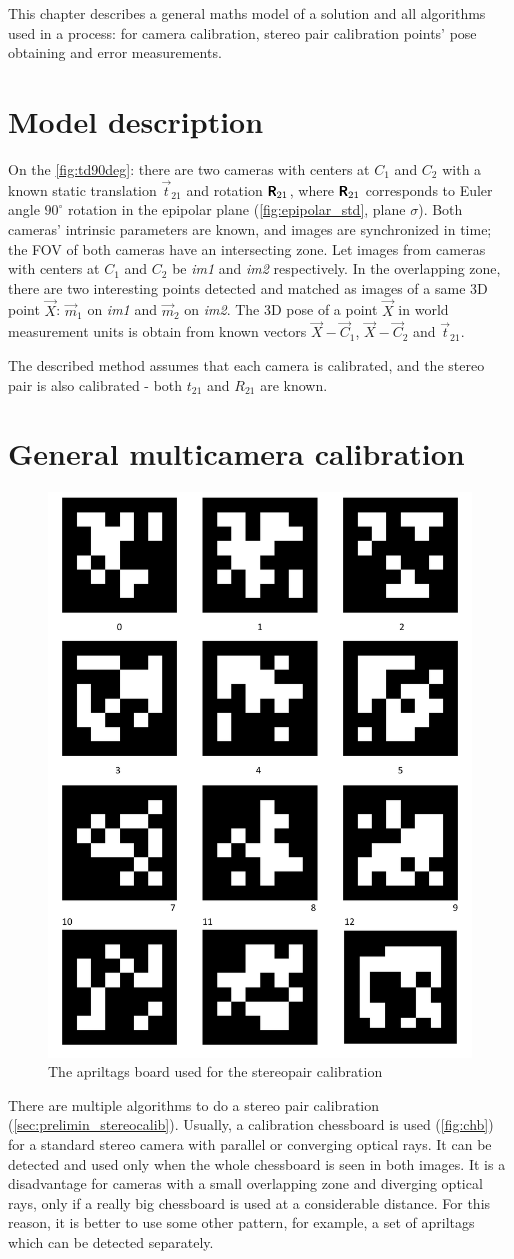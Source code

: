 This chapter describes a general maths model of a solution and all algorithms used in a process: for camera calibration, stereo pair calibration points' pose obtaining and error measurements.

\section{Model description}

On the \autoref{fig:td90deg}: there are two cameras with centers at $C_1$ and $C_2$ with a known static translation $\vec{t}_{21}$ and rotation $\pmb{\mathsf{R}}_{21}$, where $\pmb{\mathsf{R}}_{21}$ corresponds to Euler angle $90^\circ$ rotation in the epipolar plane (\autoref{fig:epipolar_std}, plane $\sigma$).
Both cameras' intrinsic parameters are known, and images are synchronized in time; the FOV of both cameras have an intersecting zone.
Let images from cameras with centers at $C_1$ and $C_2$ be \textit{im1} and \textit{im2} respectively.
In the overlapping zone, there are two interesting points detected and matched as images of a same 3D point $\vec{X}$: $\vec{m}_1$ on \textit{im1} and $\vec{m}_2$ on \textit{im2}.
The 3D pose of a point $\vec{X}$ in world measurement units is obtain from known vectors $\vec{X} - \vec{C}_1$, $\vec{X} - \vec{C}_2$ and $\vec{t}_{21}$. 

The described method assumes that each camera is calibrated, and the stereo pair is also calibrated - both $t_{21}$ and $R_{21}$ are known.

\section{General multicamera calibration}
\label{sec:stereocalib}

\begin{figure}[h]
    \centering
    \includegraphics[width=.2\textwidth]{graphics/aptags.png}
    \caption{The apriltags board used for the stereopair calibration}
    \label{fig:aptags}
\end{figure}

There are multiple algorithms to do a stereo pair calibration (\autoref{sec:prelimin_stereocalib}). 
Usually, a calibration chessboard is used (\autoref{fig:chb}) for a standard stereo camera with parallel or converging optical rays.
It can be detected and used only when the whole chessboard is seen in both images.
It is a disadvantage for cameras with a small overlapping zone and diverging optical rays, only if a really big chessboard is used at a considerable distance.
For this reason, it is better to use some other pattern, for example, a set of apriltags \cite{Malyuta2019} which can be detected separately. 

